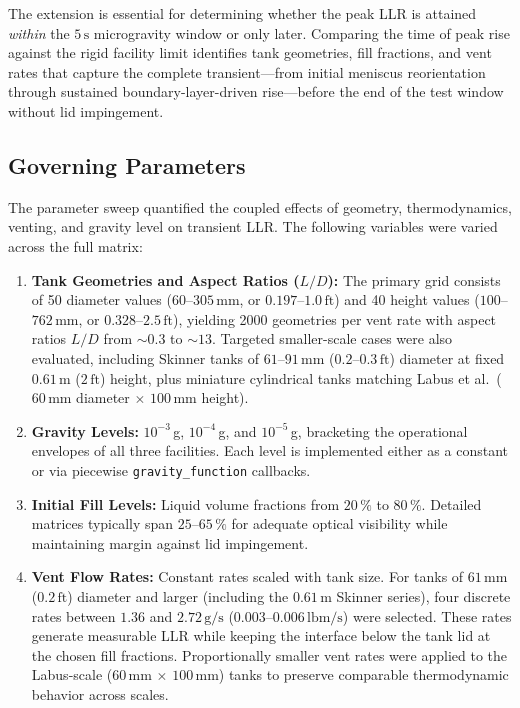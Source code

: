 \documentclass[conf]{new-aiaa}
\begin{document}
The extension is essential for determining whether the peak LLR is attained \textit{within} the $5\,\text{s}$ microgravity window or only later. Comparing the time of peak rise against the rigid facility limit identifies tank geometries, fill fractions, and vent rates that capture the complete transient---from initial meniscus reorientation through sustained boundary-layer-driven rise---before the end of the test window without lid impingement.

\subsection{Governing Parameters}
The parameter sweep quantified the coupled effects of geometry, thermodynamics, venting, and gravity level on transient LLR. The following variables were varied across the full matrix:

\begin{enumerate}
    \item \textbf{Tank Geometries and Aspect Ratios ($L/D$):} The primary grid consists of 50 diameter values ($60$--$305\,\text{mm}$, or $0.197$--$1.0\,\text{ft}$) and 40 height values ($100$--$762\,\text{mm}$, or $0.328$--$2.5\,\text{ft}$), yielding 2000 geometries per vent rate with aspect ratios $L/D$ from $\sim 0.3$ to $\sim 13$. Targeted smaller-scale cases were also evaluated, including Skinner tanks of $61$--$91\,\text{mm}$ ($0.2$--$0.3\,\text{ft}$) diameter at fixed $0.61\,\text{m}$ ($2\,\text{ft}$) height, plus miniature cylindrical tanks matching Labus et al.\ ($60\,\text{mm}$ diameter $\times$ $100\,\text{mm}$ height).

    \item \textbf{Gravity Levels:} $10^{-3}\,$g, $10^{-4}\,$g, and $10^{-5}\,$g, bracketing the operational envelopes of all three facilities. Each level is implemented either as a constant or via piecewise \texttt{gravity\_function} callbacks.

    \item \textbf{Initial Fill Levels:} Liquid volume fractions from $20\,\%$ to $80\,\%$. Detailed matrices typically span $25$--$65\,\%$ for adequate optical visibility while maintaining margin against lid impingement.

    \item \textbf{Vent Flow Rates:} Constant rates scaled with tank size. For tanks of $61\,\text{mm}$ ($0.2\,\text{ft}$) diameter and larger (including the $0.61\,\text{m}$ Skinner series), four discrete rates between $1.36$ and $2.72\,\text{g/s}$ ($0.003$--$0.006\,\text{lbm/s}$) were selected. These rates generate measurable LLR while keeping the interface below the tank lid at the chosen fill fractions. Proportionally smaller vent rates were applied to the Labus-scale ($60\,\text{mm}$ $\times$ $100\,\text{mm}$) tanks to preserve comparable thermodynamic behavior across scales.
\end{enumerate}
\end{document}
